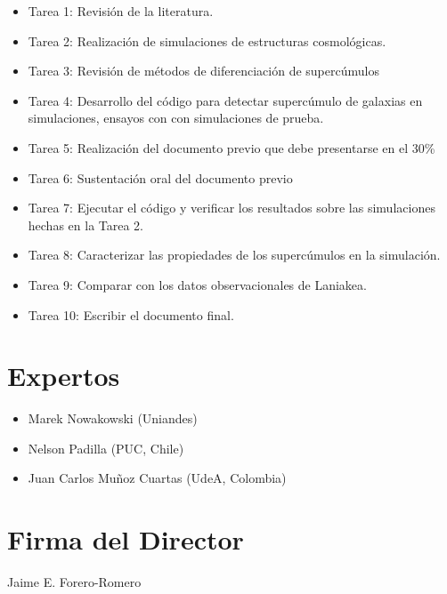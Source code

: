\documentclass[12pt]{article}
\begin{document}
\begin{itemize}
	\item Tarea 1: Revisi\'{o}n de la literatura. 
	\item Tarea 2: Realizaci\'on de simulaciones de estructuras
          cosmol\'{o}gicas. 
	\item Tarea 3: Revisi\'{o}n de m\'{e}todos de
          diferenciaci\'{o}n de superc\'{u}mulos 
	\item Tarea 4: Desarrollo del c\'{o}digo para detectar 
          superc\'{u}mulo de galaxias en simulaciones, ensayos con 
          con simulaciones de prueba.
    \item Tarea 5: Realizaci\'{o}n del documento previo que debe presentarse en el 30\%
    \item Tarea 6: Sustentaci\'{o}n oral del documento previo
	\item Tarea 7: Ejecutar el c\'{o}digo y verificar los
          resultados sobre las simulaciones hechas en la Tarea 2.
	\item Tarea 8: Caracterizar las propiedades de los
          superc\'umulos en la simulaci\'on.
	\item Tarea 9: Comparar con los datos observacionales de
          Laniakea. 
	\item Tarea 10: Escribir el documento final.
\end{itemize}

\section{Expertos}

\begin{itemize}
	\item Marek Nowakowski (Uniandes)
	\item Nelson Padilla (PUC, Chile)
	\item Juan Carlos Mu\~noz Cuartas (UdeA, Colombia)
\end{itemize}


\renewcommand\refname{Referencias}


\section*{Firma del Director}
\vspace{2.5cm}

Jaime E. Forero-Romero
\end{document}
